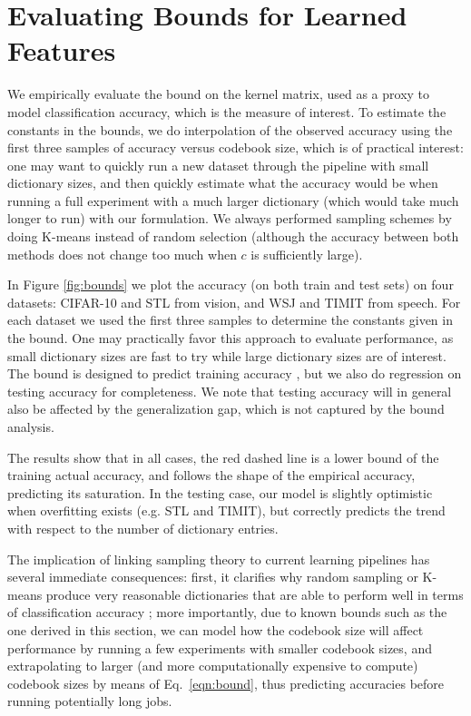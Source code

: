 \section{Evaluating Bounds for Learned Features}
We empirically evaluate the bound on the kernel matrix, used as a proxy to model classification accuracy, which is the measure of interest. To estimate the constants in the bounds, we do interpolation of the observed accuracy using the first three samples of accuracy versus codebook size, which is of practical interest: one may want to quickly run a new dataset through the pipeline with small dictionary sizes, and then quickly estimate what the accuracy would be when running a full experiment with a much larger dictionary (which would take much longer to run) with our formulation. We always performed \nystrom sampling schemes by doing K-means instead of random selection (although the accuracy between both methods does not change too much when $c$ is sufficiently large).

In Figure \ref{fig:bounds} we plot the accuracy (on both train and test sets) on four datasets: CIFAR-10 and STL from vision, and WSJ and TIMIT from speech. For each dataset we used the first three samples to determine the constants given in the bound. One may practically favor this approach to evaluate performance, as small dictionary sizes are fast to try while large dictionary sizes are of interest. The bound is designed to predict training accuracy \cite{cortes10}, but we also do regression on testing accuracy for completeness. We note that testing accuracy will in general also be affected by the generalization gap, which is not captured by the bound analysis.

The results show that in all cases, the red dashed line is a lower bound of the training actual accuracy, and follows the shape of the empirical accuracy, predicting its saturation. In the testing case, our model is slightly optimistic when overfitting exists (e.g. STL and TIMIT), but correctly predicts the trend with respect to the number of dictionary entries.

The implication of linking \nystrom sampling theory to current learning pipelines has several immediate consequences: first, it clarifies why random sampling or K-means produce very reasonable dictionaries that are able to perform well in terms of classification accuracy \cite{zhang2008improved,coates2010aistats,kumar2012sampling}; more importantly, due to known bounds such as the one derived in this section, we can model how the codebook size will affect performance by running a few experiments with smaller codebook sizes, and extrapolating to larger (and more computationally expensive to compute) codebook sizes by means of Eq.~\ref{eqn:bound}, thus predicting accuracies before running potentially long jobs.

